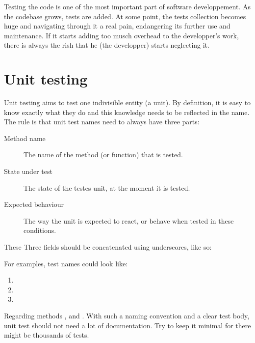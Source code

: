 Testing the code is one of the most important part of software 
developpement. As the codebase grows, tests are added. At some 
point, the tests collection becomes huge and navigating through 
it a real pain, endangering its further use and maintenance. If 
it starts adding too musch overhead to the developper's work, 
there is always the rish that he (the developper) starts neglecting 
it.

\section{Unit testing}

Unit testing aims to test one indivisible entity (a unit). By definition, 
it is easy to know exactly what they do and this knowledge needs 
to be reflected in the name. The rule is that unit test names need to 
always have three parts:

\begin{description}
 \item[Method name]        The name of the method (or function) that is tested.
 
 \item[State under test]   The state of the testes unit, at the moment 
                           it is tested.

 \item[Expected behaviour] The way the unit is expected to react, or behave 
                           when tested in these conditions.
\end{description}

These Three fields should be concatenated using underscores, like so: 

\begin{center}
\end{center}

For examples, test names could look like:

\begin{enumerate}
 \item {}
 \item {}
 \item {}
\end{enumerate}

Regarding methods ,  and 
. With such a naming convention and a clear 
test body, unit test should not need a lot of documentation. Try to 
keep it minimal for there might be thousands of tests.